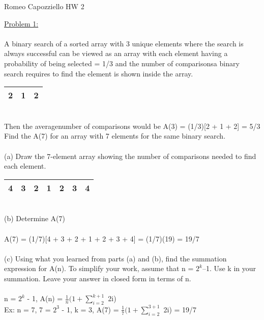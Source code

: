 \documentclass{article}
\begin{document}
    \begin{center}
        Romeo Capozziello HW 2
    \end{center}
    \underline{Problem 1:}\\\\
    A binary search of a sorted array with 3 unique elements where the search is always successful can be viewed as an array with each element having a probability of being selected = 1/3 and the number of comparisonsa binary search requires to find the element is shown inside the array.
    \begin{table}[h]
        \begin{tabular}{| c | c | c |} \hline
            2 & 1 & 2 \\ \hline    
        \end{tabular}
    \end{table}
    \\
    Then the averagenumber of comparisons would be  A(3)  =  (1/3)[2 + 1 + 2] = 5/3\\
    Find the A(7) for an array with 7 elements for the same binary search.\\
    \\
    (a) Draw the 7-element array showing the number of comparisons needed to find each element.
    \begin{table}[h]
        \begin{tabular}{| c | c | c | c | c | c | c |} \hline
            4 & 3 & 2 & 1 & 2 & 3 & 4 \\ \hline    
        \end{tabular}
    \end{table}
    \\
    (b) Determine A(7)\\
    \\
    \indent A(7) = (1/7)[4 + 3 + 2 + 1 + 2 + 3 + 4] = (1/7)(19) = 19/7\\
    \\
    (c) Using what you learned from parts (a) and (b), find the summation expression for A(n). To simplify your work, assume that n = $2^k$–1. Use k in your summation. Leave your answer in closed form in terms of n. \\
    \\
    \indent n = $2^k$ - 1, A(n) = $\frac{1}{n}(1 + \sum_{i = 2}^{k+1}$ 2i)\\\indent Ex: n = 7, 7 = $2^3$ - 1, k = 3, A(7) = $\frac{1}{7}(1 + \sum_{i = 2}^{3+1}$ 2i) = 19/7\\
    \\
\end{document}
